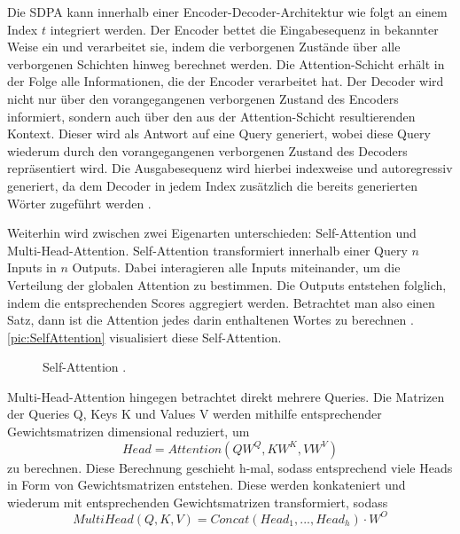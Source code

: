 \noindent
Die \ac{SDPA} kann innerhalb einer Encoder-Decoder-Architektur wie folgt an einem Index $t$ integriert werden. Der Encoder bettet die Eingabesequenz in bekannter Weise ein und verarbeitet sie, indem die verborgenen Zustände über alle verborgenen Schichten hinweg berechnet werden. Die Attention-Schicht erhält in der Folge alle Informationen, die der Encoder verarbeitet hat. Der Decoder wird nicht nur über den vorangegangenen verborgenen Zustand des Encoders informiert, sondern auch über den aus der Attention-Schicht resultierenden Kontext. Dieser wird als Antwort auf eine Query generiert, wobei diese Query wiederum durch den vorangegangenen verborgenen Zustand des Decoders repräsentiert wird. Die Ausgabesequenz wird hierbei indexweise und autoregressiv generiert, da dem Decoder in jedem Index zusätzlich die bereits generierten Wörter zugeführt werden \cite[S.~5]{VAS17}.
\newpage

\noindent
Weiterhin wird zwischen zwei Eigenarten unterschieden: Self-Attention und Multi-Head-Attention. Self-Attention transformiert innerhalb einer Query $n$ Inputs in $n$ Outputs. Dabei interagieren alle Inputs miteinander, um die Verteilung der globalen Attention zu bestimmen. Die Outputs entstehen folglich, indem die entsprechenden Scores aggregiert werden. Betrachtet man also einen Satz, dann ist die Attention jedes darin enthaltenen Wortes zu berechnen \cite{KAR19}. \autoref{pic:SelfAttention} visualisiert diese Self-Attention.\\

\begin{figure}[h!]
  \centering
  \caption{Self-Attention \cite[S.~400]{ZHA20}.}
  \label{pic:SelfAttention}
\end{figure}

\noindent
Multi-Head-Attention hingegen betrachtet direkt mehrere Queries. Die Matrizen der Queries Q, Keys K und Values V werden mithilfe entsprechender Gewichtsmatrizen dimensional reduziert, um $$Head = Attention(QW^Q, KW^K, VW^V)$$ zu berechnen. Diese Berechnung geschieht h-mal, sodass entsprechend viele Heads in Form von Gewichtsmatrizen entstehen. Diese werden konkateniert und wiederum mit entsprechenden Gewichtsmatrizen transformiert, sodass $$MultiHead(Q,K,V) = Concat(Head_1, ..., Head_h) \cdot W^O$$

